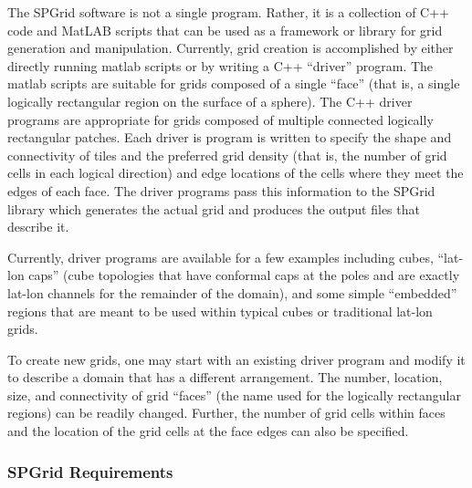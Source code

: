 The SPGrid software is not a single program.  Rather, it is a
collection of C++ code and MatLAB scripts that can be used as a
framework or library for grid generation and manipulation.  Currently,
grid creation is accomplished by either directly running matlab
scripts or by writing a C++ ``driver'' program.  The matlab scripts
are suitable for grids composed of a single ``face'' (that is, a
single logically rectangular region on the surface of a sphere).  The
C++ driver programs are appropriate for grids composed of multiple
connected logically rectangular patches.  Each driver is program is
written to specify the shape and connectivity of tiles and the
preferred grid density (that is, the number of grid cells in each
logical direction) and edge locations of the cells where they meet the
edges of each face.  The driver programs pass this information to the
SPGrid library which generates the actual grid and produces the output
files that describe it.

Currently, driver programs are available for a few examples including
cubes, ``lat-lon caps'' (cube topologies that have conformal caps at
the poles and are exactly lat-lon channels for the remainder of the
domain), and some simple ``embedded'' regions that are meant to be
used within typical cubes or traditional lat-lon grids.

To create new grids, one may start with an existing driver program and
modify it to describe a domain that has a different arrangement.  The
number, location, size, and connectivity of grid ``faces'' (the name
used for the logically rectangular regions) can be readily changed.
Further, the number of grid cells within faces and the location of
the grid cells at the face edges can also be specified.


\subsubsection{SPGrid Requirements}

